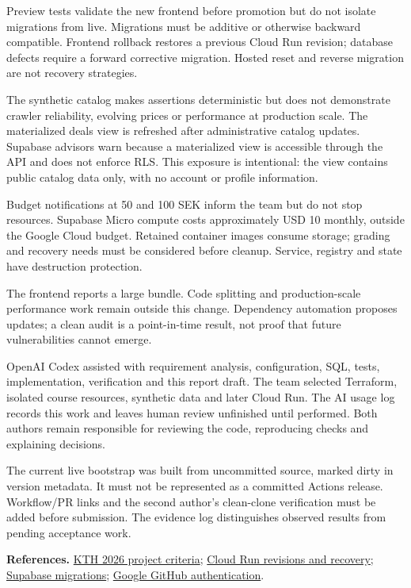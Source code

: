 \documentclass[10pt,a4paper]{article}
\begin{document}
Preview tests validate the new frontend before promotion but do not isolate migrations from live. Migrations must be additive or otherwise backward compatible. Frontend rollback restores a previous Cloud Run revision; database defects require a forward corrective migration. Hosted reset and reverse migration are not recovery strategies.

The synthetic catalog makes assertions deterministic but does not demonstrate crawler reliability, evolving prices or performance at production scale. The materialized deals view is refreshed after administrative catalog updates. Supabase advisors warn because a materialized view is accessible through the API and does not enforce RLS. This exposure is intentional: the view contains public catalog data only, with no account or profile information.

Budget notifications at 50 and 100 SEK inform the team but do not stop resources. Supabase Micro compute costs approximately USD 10 monthly, outside the Google Cloud budget. Retained container images consume storage; grading and recovery needs must be considered before cleanup. Service, registry and state have destruction protection.

The frontend reports a large bundle. Code splitting and production-scale performance work remain outside this change. Dependency automation proposes updates; a clean audit is a point-in-time result, not proof that future vulnerabilities cannot emerge.

OpenAI Codex assisted with requirement analysis, configuration, SQL, tests, implementation, verification and this report draft. The team selected Terraform, isolated course resources, synthetic data and later Cloud Run. The AI usage log records this work and leaves human review unfinished until performed. Both authors remain responsible for reviewing the code, reproducing checks and explaining decisions.

The current live bootstrap was built from uncommitted source, marked dirty in version metadata. It must not be represented as a committed Actions release. Workflow/PR links and the second author's clean-clone verification must be added before submission. The evidence log distinguishes observed results from pending acceptance work.

\textbf{References.} \href{https://github.com/KTH/devops-course/blob/2026/grading-criteria.md#project}{KTH 2026 project criteria}; \href{https://docs.cloud.google.com/run/docs/rollouts-rollbacks-traffic-migration}{Cloud Run revisions and recovery}; \href{https://supabase.com/docs/guides/local-development/database-migrations}{Supabase migrations}; \href{https://github.com/google-github-actions/auth}{Google GitHub authentication}.
\end{document}
